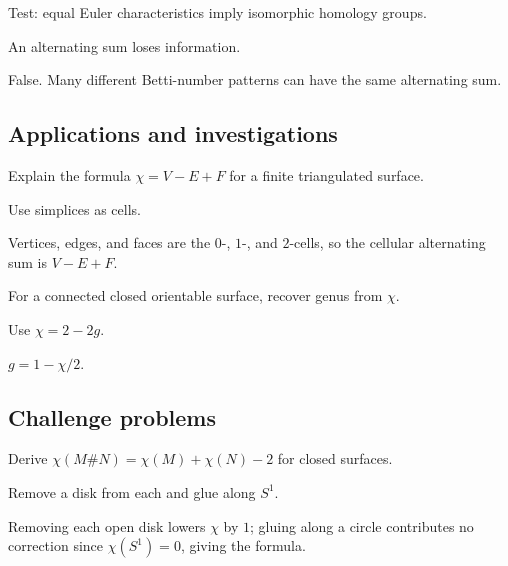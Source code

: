 \begin{exercise}\label{exr:viii21-ped-12}
Test: equal Euler characteristics imply isomorphic homology groups.
\end{exercise}
\begin{hint}
An alternating sum loses information.
\end{hint}
\begin{solution}
False. Many different Betti-number patterns can have the same alternating sum.
\end{solution}

\subsection*{Applications and investigations}

\begin{exercise}\label{exr:viii21-ped-13}
Explain the formula $\chi=V-E+F$ for a finite triangulated surface.
\end{exercise}
\begin{hint}
Use simplices as cells.
\end{hint}
\begin{solution}
Vertices, edges, and faces are the $0$-, $1$-, and $2$-cells, so the cellular alternating sum is $V-E+F$.
\end{solution}

\begin{exercise}\label{exr:viii21-ped-14}
For a connected closed orientable surface, recover genus from $\chi$.
\end{exercise}
\begin{hint}
Use $\chi=2-2g$.
\end{hint}
\begin{solution}
$g=1-\chi/2$.
\end{solution}

\subsection*{Challenge problems}

\begin{exercise}\label{exr:viii21-ped-15}
Derive $\chi(M\#N)=\chi(M)+\chi(N)-2$ for closed surfaces.
\end{exercise}
\begin{hint}
Remove a disk from each and glue along $S^1$.
\end{hint}
\begin{solution}
Removing each open disk lowers $\chi$ by $1$; gluing along a circle contributes no correction since $\chi(S^1)=0$, giving the formula.
\end{solution}

